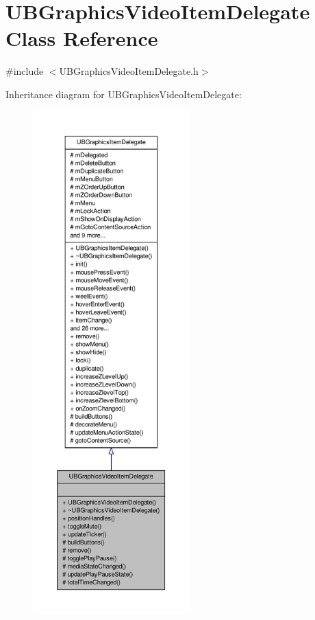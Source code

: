 \hypertarget{class_u_b_graphics_video_item_delegate}{\section{U\-B\-Graphics\-Video\-Item\-Delegate Class Reference}
\label{d8/d56/class_u_b_graphics_video_item_delegate}
}


{\ttfamily \#include $<$U\-B\-Graphics\-Video\-Item\-Delegate.\-h$>$}



Inheritance diagram for U\-B\-Graphics\-Video\-Item\-Delegate\-:
\nopagebreak
\begin{figure}[H]
\begin{center}
\leavevmode
\includegraphics[height=550pt]{df/d01/class_u_b_graphics_video_item_delegate__inherit__graph}
\end{center}
\end{figure}


